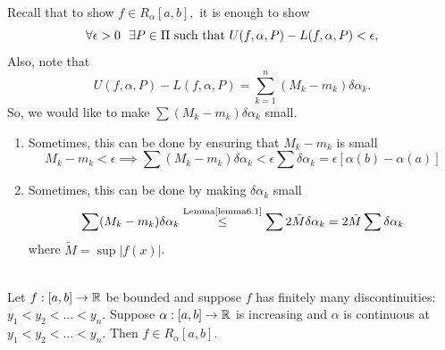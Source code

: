 \begin{remark}
    Recall that to show $f \in R_\alpha[a,b],$ it is enough to show 
    $$\forall \epsilon > 0 ~~\exists P \in \Pi \text{ such that } U(f, \alpha, P) - L(f, \alpha, P) < \epsilon,$$
    Also, note that 
    $$U(f, \alpha, P) - L(f, \alpha, P) = \sum_{k=1}^{n}(M_k - m_k)\delta \alpha_k.$$
    So, we would like to make $\sum (M_k - m_k) \delta \alpha_k$ small.
    \begin{enumerate}[$*)$]
        \item Sometimes, this can be done by ensuring that $M_k - m_k$ is small
        $$M_k - m_k < \epsilon \implies \sum (M_k - m_k)\delta \alpha_k < \epsilon \sum \delta \alpha_k = \epsilon [\alpha(b) - \alpha(a)]$$
        \item Sometimes, this can be done by making $\delta \alpha_k$ small
        $$\sum (M_k - m_k) \delta \alpha_k \overset{\text{Lemma\ref{lemma6.1}}}{\leq} \sum 2\tilde{M} \delta \alpha_k = 2\tilde{M}\sum \delta \alpha_k$$
        where $\tilde{M} = \sup |f(x)|$.
    \end{enumerate}
\end{remark}

\begin{theorem} \leavevmode \\
    \label{thm6.10}
    Let $f:[a,b] \to \mathbb{R}$ be bounded and suppose $f$ has finitely many discontinuities: $y_1 < y_2 < ... < y_n$. Suppose $\alpha : [a,b] \to \mathbb{R}$ is increasing and $\alpha$ is continuous at $y_1 < y_2 < ... < y_n$. Then $f \in R_\alpha[a,b].$
\end{theorem}

